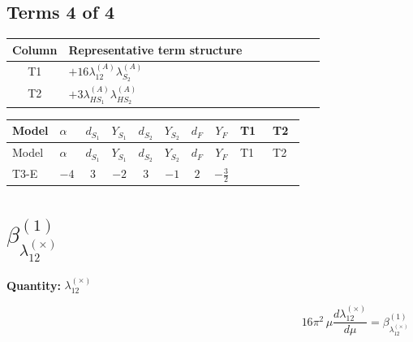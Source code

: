 \documentclass[8pt]{article}
\begin{document}
\begin{landscape}
\subsection*{Terms 4 of 4}
\begin{center}
\begin{tabular}{@{}c >{\raggedright\arraybackslash}p{0.82\linewidth}@{}}
\toprule
Column & Representative term structure \\
\midrule
T1 & \(\displaystyle +16 {\lambda_{12}^{(A)}} {\lambda_{S_2}^{(A)}}\) \\
\midrule
T2 & \(\displaystyle +3 {\lambda_{HS_1}^{(A)}} {\lambda_{HS_2}^{(A)}}\) \\
\midrule
\bottomrule
\end{tabular}
\end{center}
\smallskip
\tiny
\begin{longtable}{@{}llcccccc >{\raggedright\arraybackslash}p{0.21\linewidth} >{\raggedright\arraybackslash}p{0.21\linewidth}@{}}
\toprule
Model & $\alpha$ & $d_{S_1}$ & $Y_{S_1}$ & $d_{S_2}$ & $Y_{S_2}$ & $d_F$ & $Y_F$ & T1 & T2 \\
\midrule
\endfirsthead
\toprule
Model & $\alpha$ & $d_{S_1}$ & $Y_{S_1}$ & $d_{S_2}$ & $Y_{S_2}$ & $d_F$ & $Y_F$ & T1 & T2 \\
\midrule
\endhead
T3-E & $-4$ & $3$ & $-2$ & $3$ & $-1$ & $2$ & $-\frac{3}{2}$ & \scriptsize\adjustbox{max width=\linewidth}{$\begin{gathered} +16 {\lambda_{12}^{(A)}} {\lambda_{S_2}^{(A)}}\end{gathered}$} & \scriptsize\adjustbox{max width=\linewidth}{$\begin{gathered} +3 {\lambda_{HS_1}^{(A)}} {\lambda_{HS_2}^{(A)}}\end{gathered}$} \\
\midrule
\bottomrule
\end{longtable}
\clearpage
\section*{$\beta_{\lambda_{12}^{(\times)}}^{(1)}$}
\noindent\textbf{Quantity: }$\lambda_{12}^{(\times)}$\par\smallskip
\[16\pi^2\,\mu\frac{d \lambda_{12}^{(\times)}}{d\mu}=\beta_{\lambda_{12}^{(\times)}}^{(1)}\]

\end{landscape}
\end{document}
